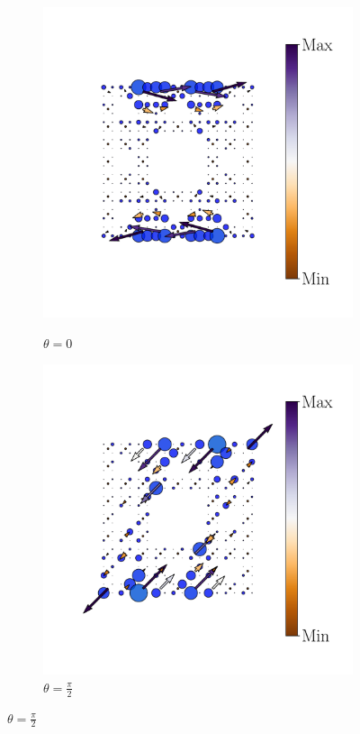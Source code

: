 \begin{figure}[h!]
\begin{minipage}[h!]{1.1\textwidth}
\begin{subfigure}[b!]{0.2 \textwidth}
             \label{}
         \end{subfigure}\hspace*{-0.5em}
          \begin{subfigure}[b!]{0.2 \textwidth}
             \caption*{$\theta = 0$}
             \includegraphics[width=\textwidth]{Imagenes/Resultados_pump_Fractal/x/hoti_pomp_x_pos3.pdf}
             \label{}
         \end{subfigure}\hspace*{-0.5em}
          \begin{subfigure}[b!]{0.2 \textwidth}
             \caption*{$\theta = \frac{\pi}{2}$}
             \includegraphics[width=\textwidth]{Imagenes/Resultados_pump_Fractal/x/hoti_pomp_x_pos4.pdf}

\end{subfigure}
\end{minipage}
\end{figure}
